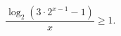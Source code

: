 \begin{ex}[type=inequality]
	\begin{condition}
		$ \dfrac{\log_2(3\cdot2^{x - 1} - 1)}{x}\geqslant1 .$
	\end{condition}
\end{ex}